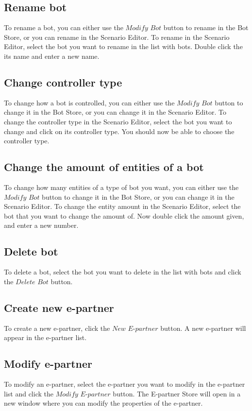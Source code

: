 \documentclass[a4paper]{article}
\begin{document}
\subsection{Rename bot}
To rename a bot, you can either use the $Modify$ $Bot$ button to rename in the Bot Store, or you can rename in the Scenario Editor. To rename in the Scenario Editor, select the bot you want to rename in the list with bots. Double click the its name and enter a new name.

\subsection{Change controller type}
To change how a bot is controlled, you can either use the $Modify$ $Bot$ button to change it in the Bot Store, or you can change it in the Scenario Editor. To change the controller type in the Scenario Editor, select the bot you want to change and click on its controller type. You should now be able to choose the controller type.

\subsection{Change the amount of entities of a bot}
To change how many entities of a type of bot you want, you can either use the $Modify$ $Bot$ button to change it in the Bot Store, or you can change it in the Scenario Editor. To change the entity amount in the Scenario Editor, select the bot that you want to change the amount of. Now double click the amount given, and enter a new number.

\subsection{Delete bot}
To delete a bot, select the bot you want to delete in the list with bots and click the $Delete$ $Bot$ button.

\subsection{Create new e-partner}
To create a new e-partner, click the $New$ $E$-$partner$ button. A new e-partner will appear in the e-partner list.

\subsection{Modify e-partner}
To modify an e-partner, select the e-partner you want to modify in the e-partner list and click the $Modify$ $E$-$partner$ button. The E-partner Store will open in a new window where you can modify the properties of the e-partner.
\end{document}
